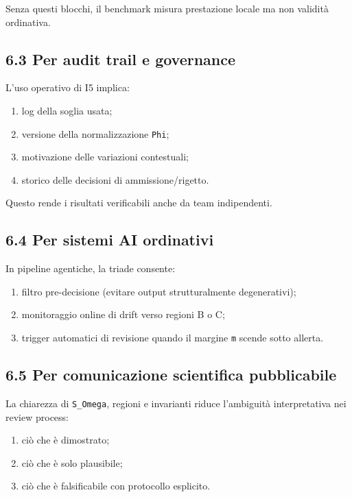 Senza questi blocchi, il benchmark misura prestazione locale ma non validità ordinativa.

\subsection{6.3 Per audit trail e governance}

L'uso operativo di I5 implica:

\begin{enumerate}
\def\labelenumi{\arabic{enumi}.}
\tightlist
\item
  log della soglia usata;
\item
  versione della normalizzazione \texttt{Phi};
\item
  motivazione delle variazioni contestuali;
\item
  storico delle decisioni di ammissione/rigetto.
\end{enumerate}

Questo rende i risultati verificabili anche da team indipendenti.

\subsection{6.4 Per sistemi AI ordinativi}

In pipeline agentiche, la triade consente:

\begin{enumerate}
\def\labelenumi{\arabic{enumi}.}
\tightlist
\item
  filtro pre-decisione (evitare output strutturalmente degenerativi);
\item
  monitoraggio online di drift verso regioni B o C;
\item
  trigger automatici di revisione quando il margine \texttt{m} scende sotto allerta.
\end{enumerate}

\subsection{6.5 Per comunicazione scientifica pubblicabile}

La chiarezza di \texttt{S\_Omega}, regioni e invarianti riduce l'ambiguità interpretativa nei review process:

\begin{enumerate}
\def\labelenumi{\arabic{enumi}.}
\tightlist
\item
  ciò che è dimostrato;
\item
  ciò che è solo plausibile;
\item
  ciò che è falsificabile con protocollo esplicito.
\end{enumerate}

